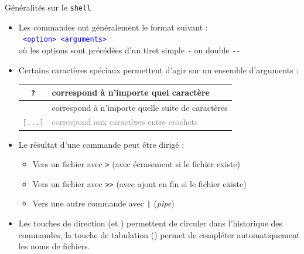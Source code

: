 \documentclass[10pt]{beamer}
\begin{document}
\begin{frame}{\Ctitle}{\stitle}
	\begin{block}{Généralités sur le {\tt shell}}
		\begin{itemize}
			\item<1-> Les commandes ont généralement le format suivant : \\
				\textcolor{blue}{\tt <nom commande> <option> <arguments>} \\
				où les options sont précédées d'un tiret simple \textcolor{Sepia}{\tt -} ou double \textcolor{Sepia}{\tt -{}-}
			\item<2-> Certains caractères spéciaux permettent d'agir sur un ensemble d'arguments : \\
				\begin{tabularx}{0.8\linewidth}{|c|X|}
					\hline
					\textcolor{Sepia}{\tt ?}    & correspond à n'importe quel caractère                      \\
					\hline
					\textcolor{Sepia}{\tt *}    & correspond à n'importe quelle suite de caractères            \\
					\hline
					\textcolor{gray}{\tt [...]} & \textcolor{gray}{correspond aux caractères entre crochets} \\
					\hline
				\end{tabularx}
			\item<3-> Le résultat d'une commande peut être dirigé :
				\begin{itemize}
					\item<4-> Vers un fichier avec \textcolor{Sepia}{\tt >} (avec écrasement si le fichier existe)
					\item<5-> Vers un fichier avec \textcolor{Sepia}{\tt >{}>} (avec ajout en fin si le fichier existe)
					\item<6-> Vers une autre commande avec \textcolor{Sepia}{\tt |} (\textit{pipe})
				\end{itemize}
			\item<7-> Les touches de direction (\UArrow et \DArrow) permettent de circuler dans l'historique des commandes, la touche de tabulation (\Tab) permet de compléter automatiquement les noms de fichiers.

		\end{itemize}
	\end{block}
\end{frame}
\end{document}
